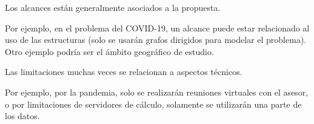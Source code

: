 Los alcances están generalmente asociados a la propuesta. \\

\begin{tcolorbox}[colback=blue!5!white,colframe=blue!75!black,title=Ejemplo]
Por ejemplo, en el problema del COVID-19, un alcance puede estar relacionado al uso de las estructuras (solo se usarán grafos dirigidos para modelar el problema). Otro ejemplo podría ser el ámbito geográfico de estudio.
\end{tcolorbox}

Las limitaciones muchas veces se relacionan a aspectos técnicos. \\

\begin{tcolorbox}[colback=blue!5!white,colframe=blue!75!black,title=Ejemplo]
Por ejemplo, por la pandemia, solo se realizarán reuniones virtuales con el asesor, o por limitaciones de servidores de cálculo, solamente se utilizarán una parte de los datos.
\end{tcolorbox}